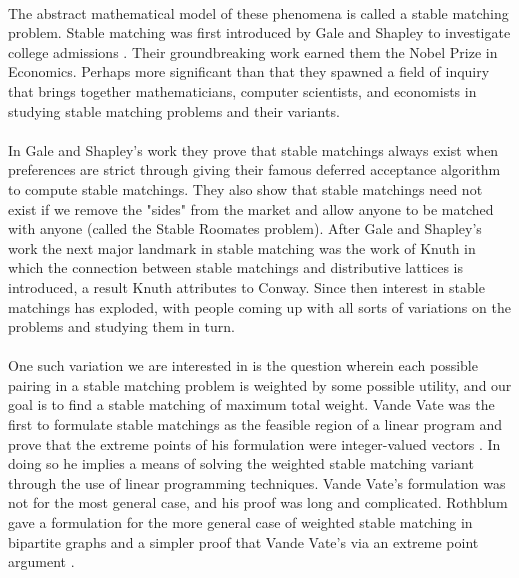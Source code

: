 \paragraph{}
The abstract mathematical model of these phenomena is called a stable matching problem. Stable matching was first introduced by Gale and Shapley to investigate college admissions \cite{gale1962college}. Their groundbreaking work earned them the Nobel Prize in Economics. Perhaps more significant than that they spawned a field of inquiry that brings together mathematicians, computer scientists, and economists in studying stable matching problems and their variants.
\paragraph{}
In Gale and Shapley's work they prove that stable matchings always exist when preferences are strict through giving their famous deferred acceptance algorithm to compute stable matchings. They also show that stable matchings need not exist if we remove the "sides" from the market and allow anyone to be matched with anyone (called the Stable Roomates problem). After Gale and Shapley's work the next major landmark in stable matching was the work of Knuth \cite{knuthmariages} in which the connection between stable matchings and distributive lattices is introduced, a result Knuth attributes to Conway. Since then interest in stable matchings has exploded, with people coming up with all sorts of variations on the problems and studying them in turn.
\paragraph{}
One such variation we are interested in is the question wherein each possible pairing in a stable matching problem is weighted by some possible utility, and our goal is to find a stable matching of maximum total weight. Vande Vate was the first to formulate stable matchings as the feasible region of a linear program and prove that the extreme points of his formulation were integer-valued vectors \cite{vate1989linear}. In doing so he implies a means of solving the weighted stable matching variant through the use of linear programming techniques. Vande Vate's formulation was not for the most general case, and his proof was long and complicated. Rothblum gave a formulation for the more general case of weighted stable matching in bipartite graphs and a simpler proof that Vande Vate's via an extreme point argument \cite{rothblum1992characterization}.
